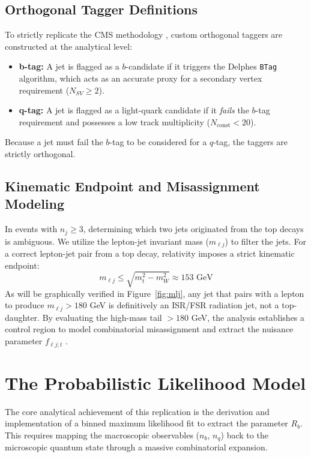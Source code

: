 \documentclass[11pt,a4paper]{article}
\begin{document}
\subsection{Orthogonal Tagger Definitions}
To strictly replicate the CMS methodology \cite{cms_paper}, custom orthogonal taggers are constructed at the analytical level:
\begin{itemize}
    \item \textbf{b-tag:} A jet is flagged as a $b$-candidate if it triggers the Delphes \texttt{BTag} algorithm, which acts as an accurate proxy for a secondary vertex requirement ($N_{SV} \ge 2$).
    \item \textbf{q-tag:} A jet is flagged as a light-quark candidate if it \textit{fails} the $b$-tag requirement and possesses a low track multiplicity ($N_{\text{const}} < 20$).
\end{itemize}
Because a jet must fail the $b$-tag to be considered for a $q$-tag, the taggers are strictly orthogonal.

\subsection{Kinematic Endpoint and Misassignment Modeling}
In events with $n_j \ge 3$, determining which two jets originated from the top decays is ambiguous. We utilize the lepton-jet invariant mass ($m_{\ell j}$) to filter the jets. For a correct lepton-jet pair from a top decay, relativity imposes a strict kinematic endpoint:
\begin{equation}
m_{\ell j} \le \sqrt{m_t^2 - m_W^2} \approx 153 \text{ GeV}
\end{equation}
As will be graphically verified in Figure~\ref{fig:mlj}, any jet that pairs with a lepton to produce $m_{\ell j} > 180$ GeV is definitively an ISR/FSR radiation jet, not a top-daughter. By evaluating the high-mass tail $> 180$ GeV, the analysis establishes a control region to model combinatorial misassignment and extract the nuisance parameter $f_{\ell j; t}$ \cite{cms_paper}.

\section{The Probabilistic Likelihood Model}
The core analytical achievement of this replication is the derivation and implementation of a binned maximum likelihood fit to extract the parameter $R_b$. This requires mapping the macroscopic observables ($n_b$, $n_q$) back to the microscopic quantum state through a massive combinatorial expansion.
\end{document}
